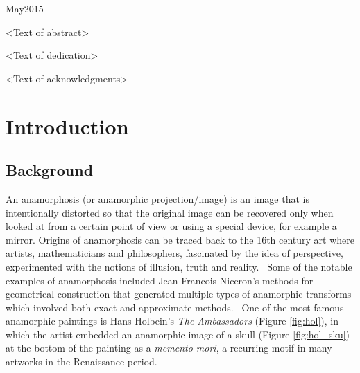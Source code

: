 \documentclass[11pt, oneside, reqno]{book}
\begin{document}
    {May}{2015}


\abstr

<Text of abstract>

\tableofcontents

\dedic

<Text of dedication> 

\acknowl

<Text of acknowledgments>

\doublespace


\chapter{Introduction}
\label{chap:int}

\section{Background}
\label{sec:bac}

An anamorphosis (or anamorphic projection/image) is an image that is intentionally distorted so that the original image can be recovered only when looked at from a certain point of view or using a special device, for example a mirror. Origins of anamorphosis can be traced back to the 16th century art where artists, mathematicians and philosophers, fascinated by the idea of perspective, experimented with the notions of illusion, truth and reality.~\cite{bib:ana_hun} Some of the notable examples of anamorphosis included Jean-Francois Niceron's methods for geometrical construction that generated multiple types of anamorphic transforms which involved both exact and approximate methods.~\cites{bib:ana_hun,bib:per_nic} One of the most famous anamorphic paintings is Hans Holbein's \textit{The Ambassadors} (Figure \ref{fig:hol}), in which the artist embedded an anamorphic image of a skull (Figure \ref{fig:hol_sku}) at the bottom of the painting as a \textit{memento mori}, a recurring motif in many artworks in the Renaissance period.

\end{document}
